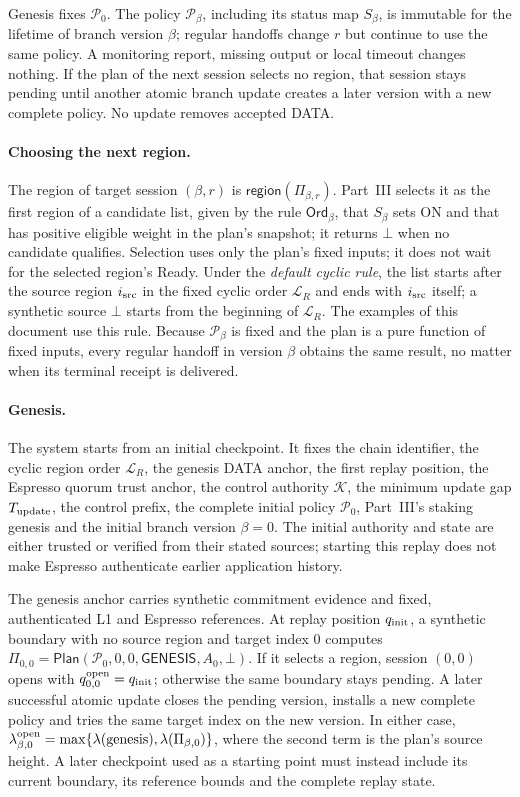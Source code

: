 \documentclass[11pt,a4paper]{article}
\newcommand{\tagg}[1]{\ensuremath{\mathsf{#1}}}
\begin{document}
Genesis fixes $\mathcal P_0$.  The policy $\mathcal P_\beta$, including its
status map $S_\beta$, is immutable for the lifetime of branch version
$\beta$; regular handoffs change $r$ but continue to use the same policy.
A monitoring report, missing output or local timeout changes nothing.  If
the plan of the next session selects no region, that session stays
pending until another atomic branch update creates a later version with a
new complete policy.  No update removes accepted DATA.

\paragraph{Choosing the next region.}
The region of target session $(\beta,r)$ is $\tagg{region}(\Pi_{\beta,r})$.
Part~III selects it as the first region of a candidate list, given by
the rule $\mathsf{Ord}_\beta$, that $S_\beta$ sets ON and that has
positive eligible weight in the plan's snapshot; it returns $\bot$ when
no candidate qualifies. Selection uses only the plan's fixed inputs; it
does not wait for the selected region's Ready. Under the \emph{default
cyclic rule}, the list starts after the source region $i_{\rm src}$ in
the fixed cyclic order $\mathcal L_R$ and ends with $i_{\rm src}$ itself;
a synthetic source $\bot$ starts from the beginning of $\mathcal L_R$.
The examples of this document use this rule. Because $\mathcal P_\beta$
is fixed and the plan is a pure function of fixed inputs, every regular
handoff in version $\beta$ obtains the same result, no matter when its
terminal receipt is delivered.

\paragraph{Genesis.}
The system starts from an initial checkpoint. It fixes the chain
identifier, the cyclic region order $\mathcal L_R$, the genesis DATA
anchor, the first replay position, the Espresso quorum trust anchor,
the control authority $\mathcal K$, the minimum update gap
$T_{\rm update}$, the control prefix, the complete initial policy
$\mathcal P_0$, Part~III's staking genesis and the initial branch version
$\beta=0$. The initial authority and state are either trusted or verified
from their stated sources; starting this replay does not make Espresso
authenticate earlier application history.

The genesis anchor carries synthetic commitment evidence and fixed,
authenticated L1 and Espresso references. At replay position
$q_{\rm init}$, a synthetic boundary with no source region and target
index 0 computes $\Pi_{0,0}=\tagg{Plan}(\mathcal P_0,0,0,\tagg{GENESIS},
A_0,\bot)$. If it selects a region, session $(0,0)$ opens with
$q^{\rm open}_{0,0}=q_{\rm init}$; otherwise the same boundary stays
pending. A later successful atomic update closes the pending version,
installs a new complete policy and tries the same target index on the
new version. In either case,
$\lambda^{\rm open}_{\beta,0}=\max\{\lambda(\text{genesis}),
\lambda(\Pi_{\beta,0})\}$, where the second term is the plan's source
height. A later checkpoint used as a starting point must instead include
its current boundary, its reference bounds and the complete replay state.
\end{document}
